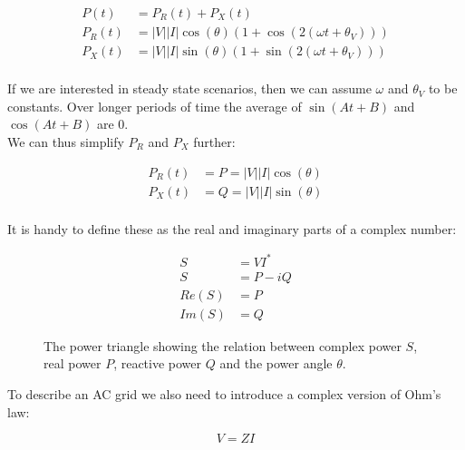 \begin{equation}
    \begin{aligned}
        P(t)   &= P_R(t) + P_X(t)\\
        P_R(t) &= |V||I| \cos(\theta) (1 + \cos(2(\omega t+\theta_V)))\\
        P_X(t) &= |V||I| \sin(\theta) (1 + \sin(2(\omega t+\theta_V)))\\
    \end{aligned}
    \label{eq:ac:power_react_and_capacitive}
\end{equation}

If we are interested in steady state scenarios, then we can assume $\omega$ and $\theta_V$ 
to be constants. Over longer periods of time the average of $\sin(A t + B)$ and $\cos(A t + B)$ are 0.\\
We can thus simplify $P_R$ and $P_X$ further:

\begin{equation}
    \begin{aligned}
        P_R(t) &= P = |V||I| \cos(\theta)\\
        P_X(t) &= Q = |V||I| \sin(\theta)\\
    \end{aligned}
    \label{eq:ac:power_react_and_imag}
\end{equation}

It is handy to define these as the real and imaginary parts of a complex number:

\begin{equation}
    \begin{aligned}
        S     &=  V I^*\\
        S     &= P - iQ\\
        Re(S) &= P\\ 
        Im(S) &= Q
    \end{aligned}
    \label{eq:ac:complex}
\end{equation}

\begin{figure}[H]
    \centering
    
    \caption{
        The power triangle showing the relation between complex power $S$,
        real power $P$, reactive power $Q$ and the power angle $\theta$.
    }
    \label{fig:ac:power_triangle}
\end{figure}

To describe an AC grid we also need to introduce a complex version
of Ohm's law:

\begin{equation}
    V = ZI
    \label{eq:ac:ohm_complex}
\end{equation}

